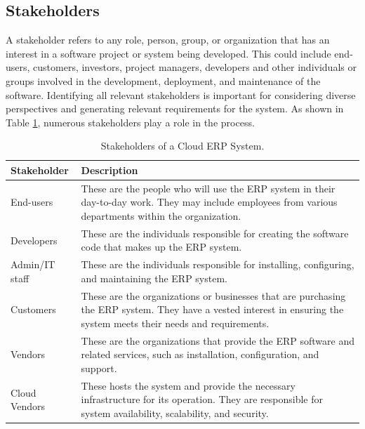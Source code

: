 \subsection{Stakeholders}
A stakeholder refers to any role, person, group, or organization that has an interest in a software
project or system being developed. This could include end-users, customers, investors, project
managers, developers and other individuals or groups involved in the development, deployment, and
maintenance of the software. Identifying all relevant stakeholders is important for considering
diverse perspectives and generating relevant requirements for the system. As shown in Table
\ref{tab:5_stakeholders}, numerous stakeholders play a role in the process.

\begin{table}[h]
    \centering
    \begin{tabular}{|l|p{10cm}|}
        \hline
        \textbf{Stakeholder} & \textbf{Description}                                                                                                                                                 \\ \hline
        End-users            & These are the people who will use the ERP system in their day-to-day work. They may include employees from various departments within the organization.              \\ \hline
        Developers           & These are the individuals responsible for creating the software code that makes up the ERP system.                                                                   \\ \hline
        Admin/IT staff       & These are the individuals responsible for installing, configuring, and maintaining the ERP system.                                                                   \\ \hline
        Customers            & These are the organizations or businesses that are purchasing the ERP system. They have a vested interest in ensuring the system meets their needs and requirements. \\ \hline
        Vendors              & These are the organizations that provide the ERP software and related services, such as installation, configuration, and support.                                    \\ \hline
        Cloud Vendors        & These hosts the system and provide the necessary infrastructure for its operation. They are responsible for system availability, scalability, and security.          \\ \hline
    \end{tabular}
    \caption{Stakeholders of a Cloud ERP System.}
    \label{tab:5_stakeholders}
\end{table}

